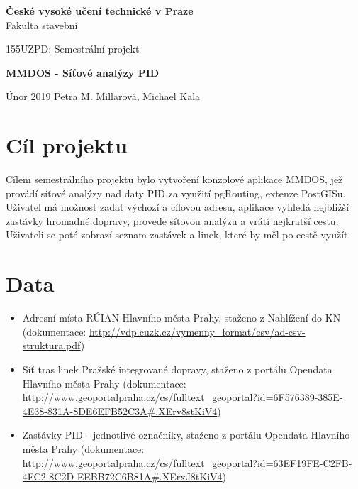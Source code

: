 \documentclass[a4paper, 12pt]{article}
\begin{document}
\begin{titlepage}
\begin{center}
\noindent
\Large \textbf{České vysoké učení technické v Praze }\\ Fakulta stavební
\vspace{5cm}

\Large


\vspace{4cm}

155UZPD: Semestrální projekt \\
\Huge

\textbf{MMDOS - Síťové analýzy PID}
\vspace{11cm}

\large
Únor 2019 \hspace{5cm} Petra M. Millarová, Michael Kala\\

\end{center}

\end{titlepage}




\pagestyle{plain}     %
\setcounter{page}{1}  %


\section{Cíl projektu}
Cílem semestrálního projektu bylo vytvoření konzolové aplikace MMDOS, jež provádí síťové analýzy nad daty PID za využití pgRouting, extenze PostGISu. Uživatel má možnost zadat výchozí a cílovou adresu, aplikace vyhledá nejbližší zastávky hromadné dopravy, provede síťovou analýzu a vrátí nejkratší cestu. Uživateli se poté zobrazí seznam zastávek a linek, které by měl po cestě využít.

\newpage
\section{Data}
\begin{itemize}
	\item Adresní místa RÚIAN Hlavního města Prahy, staženo z Nahlížení do KN (dokumentace: \url{http://vdp.cuzk.cz/vymenny_format/csv/ad-csv-struktura.pdf})
	\item Síť tras linek Pražské integrované dopravy, staženo z portálu Opendata Hlavního města Prahy (dokumentace: \url{http://www.geoportalpraha.cz/cs/fulltext_geoportal?id=6F576389-385E-4E38-831A-8DE6EFB52C3A#.XErv8stKiV4})
	\item Zastávky PID - jednotlivé označníky, staženo z portálu Opendata Hlavního města Prahy (dokumentace: \url{http://www.geoportalpraha.cz/cs/fulltext_geoportal?id=63EF19FE-C2FB-4FC2-8C2D-EEBB72C6B81A#.XErxJ8tKiV4})
\end{itemize}
\end{document}
